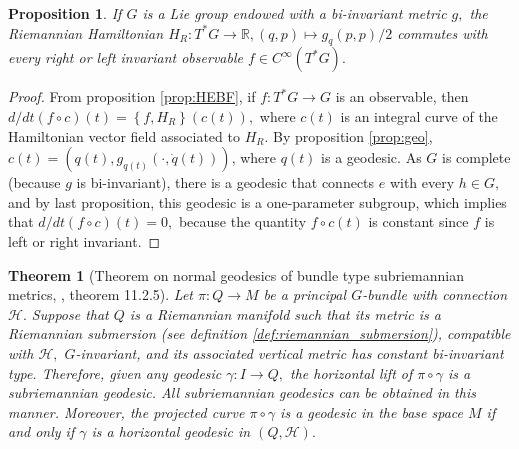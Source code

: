 \documentclass[12pt, letterpaper, reqno]{amsart}
\theoremstyle{definition}
\theoremstyle{plain}
\newtheorem{prop}{Proposition}
\newtheorem{thm}{Theorem}
\theoremstyle{remark}
\begin{document}
\begin{prop}\label{prop:essential_fact2}
	If $ G $ is a Lie group endowed with a bi-invariant metric $ g, $ the Riemannian Hamiltonian $ H_R : T^*G \rightarrow \mathbb{R}, (q,p) \mapsto g_q(p,p)/2$ commutes with every right or left invariant observable $ f\in C^\infty ( T^*G). $ 
\end{prop}
\begin{proof}
	From proposition \ref{prop:HEBF}, if $ f: T^*G \rightarrow G $ is an observable, then $ d/dt \left( f\circ c \right) (t)= \left\{ f, H_R \right\}(c(t)),  $ where $ c(t) $ is an integral curve of the Hamiltonian vector field associated to $ H_R. $ By proposition \ref{prop:geo}, $ c(t)=(q(t), g_{q(t)}(\cdot, \dot{q}(t))) $, where $ q(t) $ is a geodesic. As $ G $ is complete (because $ g $ is bi-invariant), there is a geodesic that connects $ e $ with every $ h\in G, $ and by last proposition, this geodesic is a one-parameter subgroup, which implies that $ d/dt(f\circ c)(t)=0, $ because the quantity $ f\circ c(t) $ is constant since $ f $ is left or right invariant.	
\end{proof}

\begin{thm}[Theorem on normal geodesics of bundle type subriemannian metrics, \cite{montgomery2002tour}, theorem 11.2.5]\label{thm:normal_geodesics}
	Let $ \pi: Q \rightarrow M $ be a principal $ G $-bundle with connection $ \mathcal{H}. $ Suppose that $ Q $ is a Riemannian manifold such that its metric is a Riemannian submersion (see definition \ref{def:riemannian_submersion}), compatible with $ \mathcal{H}, $ $ G $-invariant, and its associated vertical metric has constant bi-invariant type. Therefore, given any geodesic $\gamma: I \rightarrow Q, $ the horizontal lift of $ \pi\circ\gamma $ is a subriemannian geodesic. All subriemannian geodesics can be obtained in this manner. Moreover, the projected curve $ \pi\circ\gamma$ is a geodesic in the base space $ M $ if and only if $ \gamma $ is a horizontal geodesic in $ (Q, \mathcal{H}). $ 
\end{thm}
\end{document}
